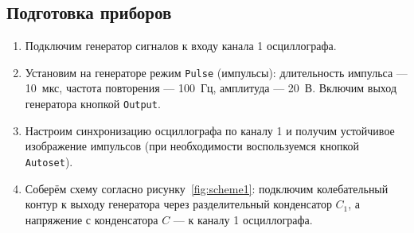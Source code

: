 \documentclass[a4paper]{article}
\begin{document}
\subsection{Подготовка приборов}
\begin{enumerate}
    \item Подключим генератор сигналов к входу канала 1 осциллографа.
    \item Установим на генераторе режим \texttt{Pulse} (импульсы):  
    длительность импульса — 10~мкс,  
    частота повторения — 100~Гц,  
    амплитуда — 20~В.  
    Включим выход генератора кнопкой \texttt{Output}.
    \item Настроим синхронизацию осциллографа по каналу 1 и получим устойчивое изображение импульсов (при необходимости воспользуемся кнопкой \texttt{Autoset}).
    \item Соберём схему согласно рисунку~\ref{fig:scheme1}: подключим колебательный контур к выходу генератора через разделительный конденсатор $C_1$, а напряжение с конденсатора $C$ — к каналу 1 осциллографа.
\end{enumerate}
\end{document}
